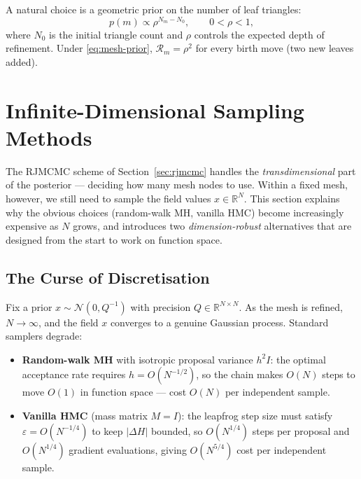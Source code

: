 \documentclass[11pt]{article}
\begin{document}
A natural choice is a geometric prior on the number of leaf triangles:
\begin{equation}
  p(m) \propto \rho^{N_m-N_0}, \qquad 0<\rho<1,
  \label{eq:mesh-prior}
\end{equation}
where $N_0$ is the initial triangle count and $\rho$ controls the expected
depth of refinement.  Under \eqref{eq:mesh-prior}, $\mathcal{R}_m=\rho^2$
for every birth move (two new leaves added).

\section{Infinite-Dimensional Sampling Methods}
\label{sec:inf-dim-samplers}

The RJMCMC scheme of Section~\ref{sec:rjmcmc} handles the \emph{transdimensional}
part of the posterior — deciding how many mesh nodes to use.  Within a fixed mesh,
however, we still need to sample the field values $x \in \mathbb{R}^N$.  This
section explains why the obvious choices (random-walk MH, vanilla HMC) become
increasingly expensive as $N$ grows, and introduces two \emph{dimension-robust}
alternatives that are designed from the start to work on function space.

\subsection{The Curse of Discretisation}
\label{sec:curse-disc}

Fix a prior $x \sim \mathcal{N}(0, Q^{-1})$ with precision $Q \in \mathbb{R}^{N\times N}$.
As the mesh is refined, $N\to\infty$, and the field $x$ converges to a genuine
Gaussian process.  Standard samplers degrade:

\begin{itemize}
  \item \textbf{Random-walk MH} with isotropic proposal variance $h^2 I$:
        the optimal acceptance rate requires $h = O(N^{-1/2})$, so the chain
        makes $O(N)$ steps to move $O(1)$ in function space — cost $O(N)$ per
        independent sample.
  \item \textbf{Vanilla HMC} (mass matrix $M = I$): the leapfrog step size must
        satisfy $\varepsilon = O(N^{-1/4})$ to keep $|\Delta H|$ bounded, so
        $O(N^{1/4})$ steps per proposal and $O(N^{1/4})$ gradient evaluations,
        giving $O(N^{5/4})$ cost per independent sample.
\end{itemize}
\end{document}

